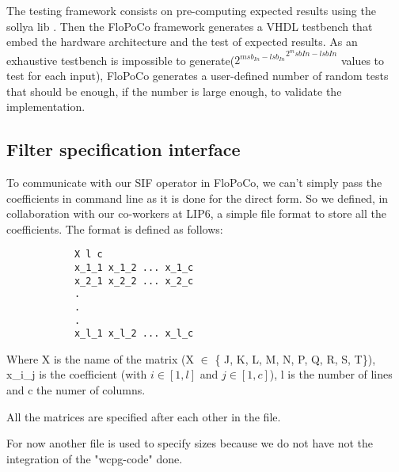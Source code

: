 	The testing framework consists on pre-computing expected results using the sollya lib \cite{ChevillardJoldesLauter2010}.
	Then the FloPoCo framework generates a VHDL testbench that embed the hardware architecture and the test of expected results.
	As an exhaustive testbench is impossible to generate(${2^{msb_{In} - lsb_{In}}}^{2^msb{In} - lsb{In}}$ values to test for each input),
	FloPoCo generates a user-defined number of random tests that should be enough, if the number is large enough, to validate the implementation.

		\subsection{Filter specification interface}
		To communicate with our SIF operator in FloPoCo, we can't simply pass the coefficients in command line as it is done for the direct form.
		So we defined, in collaboration with our co-workers at LIP6, a simple file format to store all the coefficients.
		The format is defined as follows:

		\begin{verbatim}
			X l c
			x_1_1 x_1_2 ... x_1_c
			x_2_1 x_2_2 ... x_2_c
			.
			.
			.
			x_l_1 x_l_2 ... x_l_c
		\end{verbatim}

		Where X is the name of the matrix (X $\in$ \{ J, K, L, M, N, P, Q, R, S, T\}), x\_i\_j is the coefficient (with $i \in [1, l]$ and $j \in [1, c]$), l is the number of lines and c the numer of columns.

		All the matrices are specified after each other in the file.

		For now another file is used to specify sizes because we do not have not the integration of the "wcpg-code" done.



